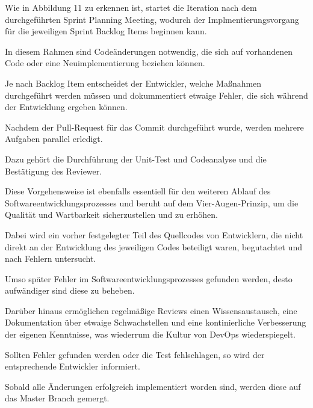 Wie in Abbildung 11 zu erkennen ist, startet die Iteration nach dem durchgeführten Sprint Planning Meeting, wodurch der Implmentierungsvorgang für die jeweiligen Sprint Backlog Items beginnen kann. 

In diesem Rahmen sind Codeänderungen notwendig, die sich auf vorhandenen Code oder eine Neuimplementierung beziehen können. 

Je nach Backlog Item entscheidet der Entwickler, welche Maßnahmen durchgeführt werden müssen und dokummentiert etwaige Fehler, die sich während der Entwicklung ergeben können.  

Nachdem der Pull-Request für das Commit durchgeführt wurde, werden mehrere Aufgaben parallel erledigt. 

Dazu gehört die Durchführung der Unit-Test und Codeanalyse und die Bestätigung des Reviewer.

Diese Vorgehensweise ist ebenfalls essentiell für den weiteren Ablauf des Softwareentwicklungsprozesses und beruht auf dem Vier-Augen-Prinzip, um die Qualität und Wartbarkeit sicherzustellen und zu erhöhen.  

Dabei wird ein vorher festgelegter Teil des Quellcodes von Entwicklern, die nicht direkt an der Entwicklung des jeweiligen Codes beteiligt waren, begutachtet und nach Fehlern untersucht. 

Umso später Fehler im Softwareentwicklungsprozesses gefunden werden, desto aufwändiger sind diese zu beheben. 

Darüber hinaus ermöglichen regelmäßige Reviews einen Wissensaustausch, eine Dokumentation über etwaige Schwachstellen und eine kontinierliche Verbesserung der eigenen Kenntnisse, was wiederrum die Kultur von DevOps wiederspiegelt. 

Sollten Fehler gefunden werden oder die Test fehlschlagen, so wird der entsprechende Entwickler informiert. 

Sobald alle Änderungen erfolgreich implementiert worden sind, werden diese auf das Master Branch gemergt. 

